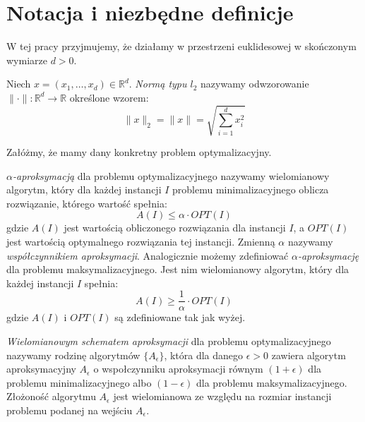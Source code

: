 \chapter{Notacja i niezbędne definicje}\label{preliminaries}

W tej pracy przyjmujemy, że działamy w przestrzeni euklidesowej w skończonym wymiarze $d > 0$.

\begin{definition}
    Niech $x = (x_{1}, \dots, x_{d}) \in \mathbb{R}^{d}$.
    \emph{Normą typu $l_{2}$} nazywamy odwzorowanie $\| \cdot \|: \mathbb{R}^{d} \rightarrow \mathbb{R}$ określone wzorem:
    \begin{equation}
        \|x\|_{2} = \|x\| = \sqrt{ \sum_{i = 1}^{d} x_{i}^{2} }
    \end{equation}
\end{definition}

\noindent
Załóżmy, że mamy dany konkretny problem optymalizacyjny. 

\begin{definition}
    \emph{$\alpha$-aproksymacją} dla problemu optymalizacyjnego nazywamy wielomianowy algorytm, który dla każdej instancji $I$ problemu minimalizacyjnego oblicza rozwiązanie, którego wartość spełnia: 
    \begin{equation}
        A(I) \leq \alpha \cdot OPT(I)
    \end{equation}
    gdzie $A(I)$ jest wartością obliczonego rozwiązania dla instancji $I$, a $OPT(I)$ jest wartością optymalnego rozwiązania tej instancji.
    Zmienną $\alpha$ nazywamy \textit{współczynnikiem aproksymacji}.
    Analogicznie możemy zdefiniować  \emph{$\alpha$-aproksymację} dla problemu maksymalizacyjnego.
    Jest nim wielomianowy algorytm, który dla każdej instancji $I$ spełnia:
    \begin{equation}
        A(I) \geq \frac{1}{\alpha} \cdot OPT(I)
    \end{equation}
    gdzie $A(I)$ i $OPT(I)$ są zdefiniowane tak jak wyżej.
\end{definition}

\begin{definition}
    \emph{Wielomianowym schematem aproksymacji} dla problemu optymalizacyjnego nazywamy rodzinę algorytmów $\{A_{\epsilon}\}$, która dla danego $\epsilon > 0$ zawiera algorytm aproksymacyjny $A_{\epsilon}$ o wspołczynniku aproksymacji równym $(1+\epsilon)$ dla problemu minimalizacyjnego albo $(1-\epsilon)$ dla problemu maksymalizacyjnego.
    Złożoność algorytmu $A_{\epsilon}$ jest wielomianowa ze względu na rozmiar instancji problemu podanej na wejściu $A_{\epsilon}$.
\end{definition}

